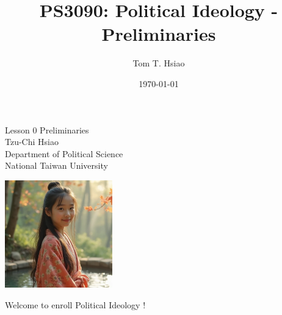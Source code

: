 \documentclass{beamer}
\title{PS3090: Political Ideology - Preliminaries}
\author{Tom T. Hsiao}
\date{\today}
\begin{document}
\begin{frame}
\begin{center}
\Large{Lesson 0 Preliminaries} \\
\vspace{3em}
\normalsize{Tzu-Chi Hsiao} \\
\vspace{3em}
\small{Department of Political Science} \\
\vspace{1em}
\small{National Taiwan University} \\
\end{center}
\end{frame}
\begin{frame}{}
\begin{center}
\includegraphics[width=0.35\textwidth]{instructor.png}
\end{center}
\vspace{1em}
\begin{center}
\large{Welcome to enroll Political Ideology !}
\end{center}
\end{frame}
\end{document}
